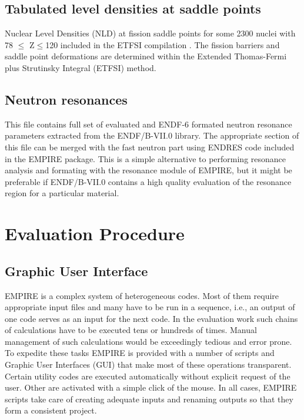 \subsection{Tabulated level densities at saddle points}

Nuclear Level Densities (NLD) at fission saddle points for some 2300 nuclei
with 78 $\le$ Z$\le$120 included in the ETFSI compilation \cite%
{Mamdouh(2001)}. The fission barriers and saddle point deformations are
determined within the Extended Thomas-Fermi plus Strutinsky Integral (ETFSI)
method.

\subsection{Neutron resonances}

This file contains full set of evaluated and ENDF-6 formated neutron
resonance parameters extracted from the ENDF/B-VII.0 library. The
appropriate section of this file can be merged with the fast neutron part
using ENDRES code included in the EMPIRE package. This is a simple
alternative to performing resonance analysis and formating with the
resonance module of EMPIRE, but it might be preferable if ENDF/B-VII.0
contains a high quality evaluation of the resonance region for a particular
material.


\section{Evaluation Procedure}

\subsection{Graphic User Interface}

EMPIRE is a complex system of heterogeneous codes. Most of them require
appropriate input files and many have to be run in a sequence, i.e., an
output of one code serves as an input for the next code. In the evaluation
work such chains of calculations have to be executed tens or hundreds of
times. Manual management of such calculations would be exceedingly tedious
and error prone. To expedite these tasks EMPIRE is provided with a number of
scripts and Graphic User Interfaces (GUI) that make most of these operations
transparent. Certain utility codes are executed automatically without
explicit request of the user. Other are activated with a simple click of the
mouse. In all cases, EMPIRE scripts take care of creating adequate inputs
and renaming outputs so that they form a consistent project.


